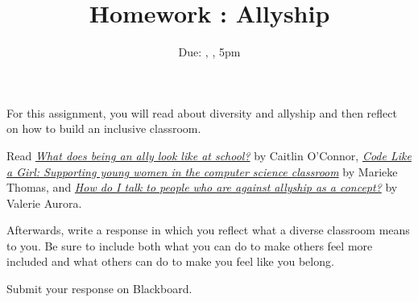 \documentclass[12pt]{article}
\title{Homework \hwno: Allyship}
\date{Due: \dayofweekname{\duedate}{\duemonth}{\year}, \monthname[\duemonth] \duedate, 5pm}
\begin{document}
\maketitle

For this assignment, you will read about diversity and allyship and then reflect on how to build an inclusive classroom.

Read \href{https://embodyedu.wordpress.com/2020/06/29/what-does-educational-allyship-look-like/}{\emph{What does being an ally look like at school?}} by Caitlin O'Connor, 
\href{https://blog.upperlinecode.com/supporting-girls-in-computer-science-bafba150989e}{\emph{Code Like a Girl: Supporting young women in the computer science classroom}} by Marieke Thomas, and 
\href{https://dearally.com/2019/08/20/14-how-do-i-talk-to-people-who-are-against-allyship-as-a-concept/}{\emph{How do I talk to people who are against allyship as a concept?}} by Valerie Aurora.

Afterwards, write a response in which you reflect what a diverse classroom means to you.  Be sure to include both what you can do to make others feel more included and what others can do to make you feel like you belong.

Submit your response on Blackboard.
\end{document}
